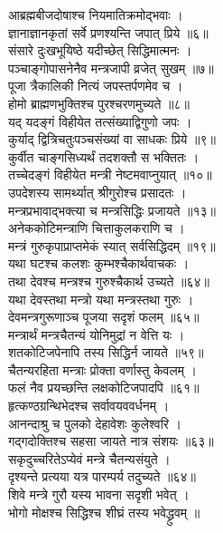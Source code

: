 आब्रह्मबीजदोषाश्च नियमातिक्रमोद्भवाः ।\\[-2mm]
ज्ञानाज्ञानकृतां सर्वे प्रणश्यन्ति जपात् प्रिये ॥६॥\\
संसारे दुःखभूयिष्ठे यदीच्छेत् सिद्धिमात्मनः ।\\[-2mm]
पञ्चाङ्गोपासनेनैव मन्त्रजापी व्रजेत् सुखम् ॥७॥\\ 
पूजा त्रैकालिकी नित्यं जपस्तर्पणमेव च ।\\[-2mm]
होमो ब्राह्मणभुक्तिश्च पुरश्चरणमुच्यते ॥८॥\\
यद् यदङ्गं विहीयेत तत्संख्याद्विगुणो जपः ।\\[-2mm]
कुर्याद् द्वित्रिचतुःपञ्चसंख्यां वा साधकः प्रिये ॥९॥\\
कुर्वीत चाङ्गसिध्यर्थं तदशक्तौ स भक्तितः ।\\[-2mm]
तच्चेदङ्गं विहीयेत मन्त्री नेष्टमवाप्नुयात् ॥१०॥\\
उपदेशस्य सामर्थ्यात् श्रीगुरोश्च प्रसादतः ।\\[-2mm]
मन्त्रप्रभावाद्भक्त्या च मन्त्रसिद्धिः प्रजायते ॥१३॥\\
अनेककोटिमन्त्राणि चित्ताकुलकराणि च ।\\[-2mm]
मन्त्रं गुरुकृपाप्राप्तमेकं स्यात् सर्वसिद्धिदम् ॥१९॥\\
यथा घटश्च कलशः कुम्भश्चैकार्थवाचकः ।\\[-2mm]
तथा देवश्च मन्त्रश्च गुरुश्चैकार्थ उच्यते ॥६४॥\\
यथा देवस्तथा मन्त्रो यथा मन्त्रस्तथा गुरुः ।\\[-2mm]
देवमन्त्रगुरूणाञ्च पूजया सदृशं फलम् ॥६५॥\\
मन्त्रार्थं मन्त्रचैतन्यं योनिमुद्रां न वेत्ति यः ।\\[-2mm]
शतकोटिजपेनापि तस्य सिद्धिर्न जायते ॥५९॥\\
चैतन्यरहिता मन्त्राः प्रोक्ता वर्णास्तु केवलम् ।\\[-2mm]
फलं नैव प्रयच्छन्ति लक्षकोटिजपादपि ॥६१॥\\
हृत्कण्ठग्रन्थिभेदश्च सर्वावयववर्धनम् ।\\[-2mm]
आनन्दाश्रु च पुलको देहावेशः कुलेश्वरि ।\\[-2mm]
गद्गदोक्तिश्च सहसा जायते नात्र संशयः ॥६३॥\\
सकृदुच्चरितेऽप्येवं मन्त्रे चैतन्यसंयुते ।\\[-2mm]
दृश्यन्ते प्रत्यया यत्र पारम्पर्य तदुच्यते ॥६४॥\\
शिवे मन्त्रे गुरौ यस्य भावना सदृशी भवेत् ।\\[-2mm]
भोगो मोक्षश्च सिद्धिश्च शीघ्रं तस्य भवेद्ध्रुवम् ॥\\

